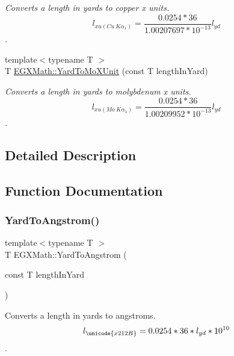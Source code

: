 \begin{DoxyCompactItemize}
\begin{DoxyCompactList}\small\item\em Converts a length in yards to copper x units. \[ l_{xu(Cu\ K\alpha_1)}=\frac{0.0254 * 36}{1.00207697*10^{-13}} l_{yd}\]. \end{DoxyCompactList}\item 
{\footnotesize template$<$typename T $>$ }\\T \mbox{\hyperlink{group___e_g_x_math-_conversions-_length_conversions-_imperial-_yard-_non-_s_i_ga81f1fa776a2154865e8ee4be46ef693d}{E\+G\+X\+Math\+::\+Yard\+To\+Mo\+X\+Unit}} (const T length\+In\+Yard)
\begin{DoxyCompactList}\small\item\em Converts a length in yards to molybdenum x units. \[ l_{xu(Mo\ K\alpha_1)}=\frac{0.0254 * 36}{1.00209952*10^{-13}} l_{yd}\]. \end{DoxyCompactList}\end{DoxyCompactItemize}


\subsection{Detailed Description}


\subsection{Function Documentation}
\mbox{\label{group___e_g_x_math-_conversions-_length_conversions-_imperial-_yard-_non-_s_i_gaacff083bdc6b954da2e4b63f857cb429}} 
\subsubsection{\texorpdfstring{Yard\+To\+Angstrom()}{YardToAngstrom()}}
{\footnotesize\ttfamily template$<$typename T $>$ \\
T E\+G\+X\+Math\+::\+Yard\+To\+Angstrom (\begin{DoxyParamCaption}\item[{const T}]{length\+In\+Yard }\end{DoxyParamCaption})}



Converts a length in yards to angstroms. \[ l_{\unicode{x212B}}=0.0254 * 36 * l_{yd} * 10^{10} \]. 

